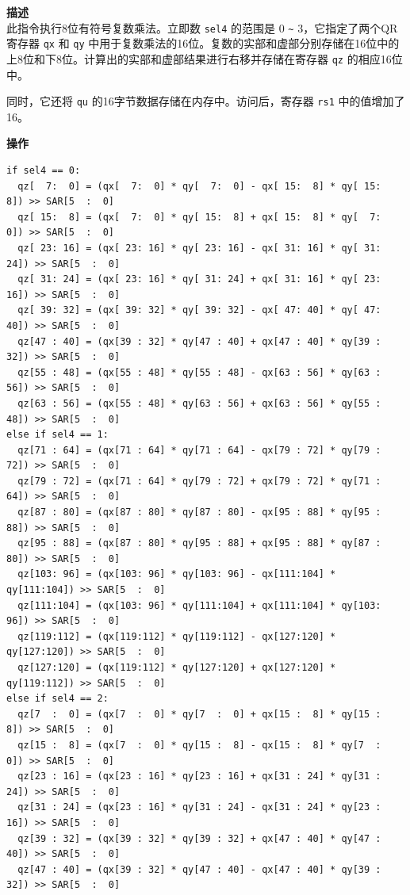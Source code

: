 \textbf{描述}\\
此指令执行8位有符号复数乘法。立即数 \lstinline{sel4} 的范围是 0 \verb+~+ 3，它指定了两个QR寄存器 \lstinline{qx} 和 \lstinline{qy} 中用于复数乘法的16位。复数的实部和虚部分别存储在16位中的上8位和下8位。计算出的实部和虚部结果进行右移并存储在寄存器 \lstinline{qz} 的相应16位中。

同时，它还将 \lstinline{qu} 的16字节数据存储在内存中。访问后，寄存器 \lstinline{rs1} 中的值增加了16。

\textbf{操作}\\
\begin{lstlisting}
if sel4 == 0:
  qz[  7:  0] = (qx[  7:  0] * qy[  7:  0] - qx[ 15:  8] * qy[ 15:  8]) >> SAR[5  :  0]
  qz[ 15:  8] = (qx[  7:  0] * qy[ 15:  8] + qx[ 15:  8] * qy[  7:  0]) >> SAR[5  :  0]
  qz[ 23: 16] = (qx[ 23: 16] * qy[ 23: 16] - qx[ 31: 16] * qy[ 31: 24]) >> SAR[5  :  0]
  qz[ 31: 24] = (qx[ 23: 16] * qy[ 31: 24] + qx[ 31: 16] * qy[ 23: 16]) >> SAR[5  :  0]
  qz[ 39: 32] = (qx[ 39: 32] * qy[ 39: 32] - qx[ 47: 40] * qy[ 47: 40]) >> SAR[5  :  0]
  qz[47 : 40] = (qx[39 : 32] * qy[47 : 40] + qx[47 : 40] * qy[39 : 32]) >> SAR[5  :  0]
  qz[55 : 48] = (qx[55 : 48] * qy[55 : 48] - qx[63 : 56] * qy[63 : 56]) >> SAR[5  :  0]
  qz[63 : 56] = (qx[55 : 48] * qy[63 : 56] + qx[63 : 56] * qy[55 : 48]) >> SAR[5  :  0]
else if sel4 == 1:
  qz[71 : 64] = (qx[71 : 64] * qy[71 : 64] - qx[79 : 72] * qy[79 : 72]) >> SAR[5  :  0]
  qz[79 : 72] = (qx[71 : 64] * qy[79 : 72] + qx[79 : 72] * qy[71 : 64]) >> SAR[5  :  0]
  qz[87 : 80] = (qx[87 : 80] * qy[87 : 80] - qx[95 : 88] * qy[95 : 88]) >> SAR[5  :  0]
  qz[95 : 88] = (qx[87 : 80] * qy[95 : 88] + qx[95 : 88] * qy[87 : 80]) >> SAR[5  :  0]
  qz[103: 96] = (qx[103: 96] * qy[103: 96] - qx[111:104] * qy[111:104]) >> SAR[5  :  0]
  qz[111:104] = (qx[103: 96] * qy[111:104] + qx[111:104] * qy[103: 96]) >> SAR[5  :  0]
  qz[119:112] = (qx[119:112] * qy[119:112] - qx[127:120] * qy[127:120]) >> SAR[5  :  0]
  qz[127:120] = (qx[119:112] * qy[127:120] + qx[127:120] * qy[119:112]) >> SAR[5  :  0]
else if sel4 == 2:
  qz[7  :  0] = (qx[7  :  0] * qy[7  :  0] + qx[15 :  8] * qy[15 :  8]) >> SAR[5  :  0]
  qz[15 :  8] = (qx[7  :  0] * qy[15 :  8] - qx[15 :  8] * qy[7  :  0]) >> SAR[5  :  0]
  qz[23 : 16] = (qx[23 : 16] * qy[23 : 16] + qx[31 : 24] * qy[31 : 24]) >> SAR[5  :  0]
  qz[31 : 24] = (qx[23 : 16] * qy[31 : 24] - qx[31 : 24] * qy[23 : 16]) >> SAR[5  :  0]
  qz[39 : 32] = (qx[39 : 32] * qy[39 : 32] + qx[47 : 40] * qy[47 : 40]) >> SAR[5  :  0]
  qz[47 : 40] = (qx[39 : 32] * qy[47 : 40] - qx[47 : 40] * qy[39 : 32]) >> SAR[5  :  0]

\end{lstlisting}
